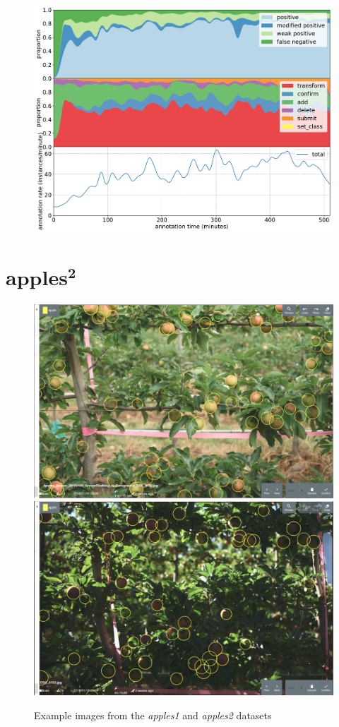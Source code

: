 \begin{figure}[!h]
\centering
\includegraphics[width=1.0\linewidth]{charts/action_annotations/apples1.pdf}
\caption{  }
\label{fig:apples1_annotation}
\end{figure}

\pagebreak
\section{$\mathbf{apples^2}$}
\label{sec:apples2_details}


\begin{figure}[!h]
  \includegraphics[width=0.475\linewidth]{figures/annotation/screenshots/apples2.png}
  \hfill
  \includegraphics[width=0.475\linewidth]{figures/annotation/screenshots/apples2_dark.png}
\caption{Example images from the \emph{apples1} and \emph{apples2} datasets}
\label{fig:apples2_dataset}  
\end{figure}


